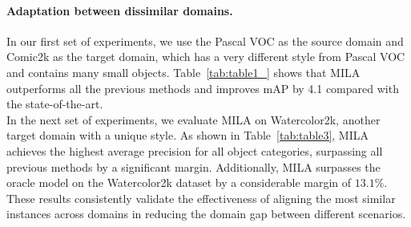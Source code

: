 \documentclass{bmvc2k}
\begin{document}
\begin{table}
\begin{minipage}[t]{.5\textwidth}
   \label{tab:table2}
\end{minipage}\qquad
\begin{minipage}[t]{.45\textwidth}
  \footnotesize	
  \centering
  \addtolength{\tabcolsep}{-3.0pt}
   \caption{Results on the Cityscapes test set for \textbf{Sim10k $\xrightarrow{}$ Cityscapes} adaptation.} 
   \label{tab:table2_}
\end{minipage}\qquad
\end{table}












\paragraph{Adaptation between dissimilar domains.}
In our first set of experiments, we use the Pascal VOC as the source domain and Comic2k as the target domain, which has a very different style from Pascal VOC and contains many small objects. Table~\ref{tab:table1_} shows that MILA outperforms all the previous methods and improves mAP by 4.1 compared with the state-of-the-art. 
\\[2.5pt]
In the next set of experiments, we evaluate MILA on Watercolor2k, another target domain with a unique style. As shown in Table~\ref{tab:table3}, MILA achieves the highest average precision for all object categories, surpassing all previous methods by a significant margin. Additionally, MILA surpasses the oracle model on the Watercolor2k dataset by a considerable margin of $13.1\%$. 
These results consistently validate the effectiveness of aligning the most similar instances across domains in reducing the domain gap between different scenarios.
\end{document}
